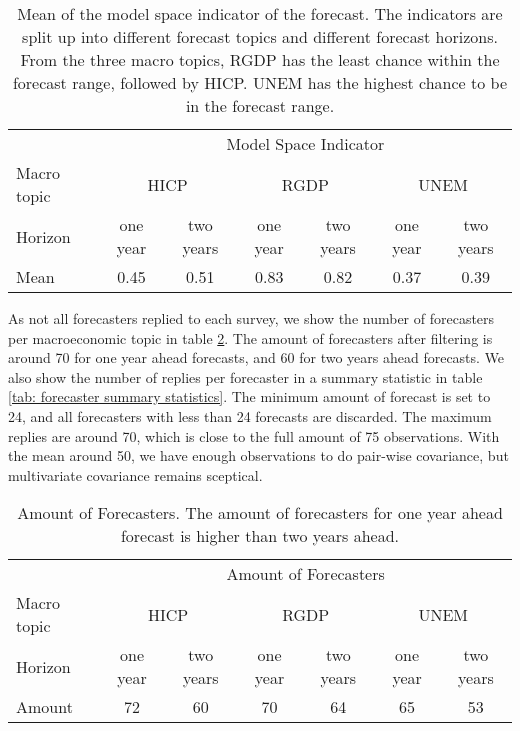 \documentclass[11pt]{article}
\begin{document}
\begin{table}[!h]
	\centering
	\caption{Mean of the model space indicator of the forecast. The indicators are split up into different forecast topics and different forecast horizons. From the three macro topics, RGDP has the least chance within the forecast range, followed by HICP. UNEM has the highest chance to be in the forecast range.}
	\label{tab: modelspace summary statistics}
	\begin{tabular}{lcccccc}
		\hline
		&\multicolumn{6}{c}{Model Space Indicator}\\
		\cmidrule(lr){2-7}
		Macro topic & \multicolumn{2}{c}{HICP} & \multicolumn{2}{c}{RGDP} & \multicolumn{2}{c}{UNEM} \\
		\cmidrule(lr){2-3} \cmidrule(lr){4-5}\cmidrule(lr){6-7}
		Horizon     & one year & two years & one year & two years & one year & two years \\ 
		\hline
		Mean        & 0.45        & 0.51         & 0.83        & 0.82        & 0.37         & 0.39       \\
		\hline
	\end{tabular}
\end{table}

As not all forecasters replied to each survey, we show the number of forecasters per macroeconomic topic in table \ref{tab: amount of forecasters}. The amount of forecasters after filtering is around 70 for one year ahead forecasts, and 60 for two years ahead forecasts. We also show the number of replies per forecaster in a summary statistic in table \ref{tab: forecaster summary statistics}. The minimum amount of forecast is set to 24, and all forecasters with less than 24 forecasts are discarded. The maximum replies are around 70, which is close to the full amount of 75 observations. With the mean around 50, we have enough observations to do pair-wise covariance, but multivariate covariance remains sceptical.

\begin{table}[!h]
	\centering
	\caption{Amount of Forecasters. The amount of forecasters for one year ahead forecast is higher than two years ahead.}
	\label{tab: amount of forecasters}
	\begin{tabular}{lcccccc}
		\hline
		&\multicolumn{6}{c}{Amount of Forecasters}\\
		\cmidrule(lr){2-7}
		Macro topic & \multicolumn{2}{c}{HICP} & \multicolumn{2}{c}{RGDP} & \multicolumn{2}{c}{UNEM} \\
		\cmidrule(lr){2-3} \cmidrule(lr){4-5}\cmidrule(lr){6-7}
		Horizon     & one year & two years & one year & two years & one year & two years \\ 
		\hline
		Amount        &      72   &60          &70         &64         & 65         & 53       \\
		\hline
	\end{tabular}
\end{table}
\end{document}
